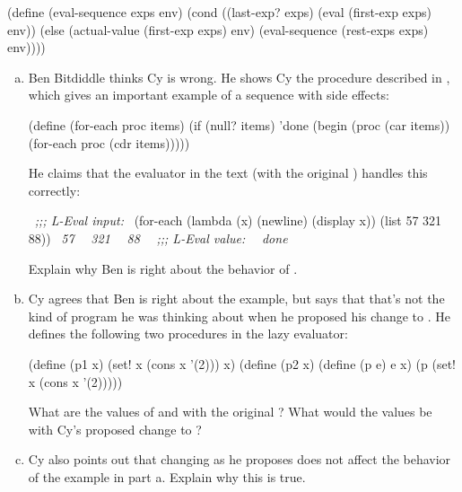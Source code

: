 \begin{exerciseGroup}
\begin{codeBlock}
(define (eval-sequence exps env)
  (cond ((last-exp? exps) (eval (first-exp exps) env))
        (else (actual-value (first-exp exps) env)
              (eval-sequence (rest-exps exps) env))))
\end{codeBlock}

\begin{enumerate}[a.]

\item
Ben Bitdiddle thinks Cy is wrong.  He shows Cy the  procedure
described in , which gives an important example of a
sequence with side effects:

\begin{codeBlock}
(define (for-each proc items)
  (if (null? items)
      'done
      (begin (proc (car items))
             (for-each proc (cdr items)))))
\end{codeBlock}

He claims that the evaluator in the text (with the original
) handles this correctly:

\begin{codeBlock}
~\textit{;;; L-Eval input:}~
(for-each (lambda (x) (newline) (display x))
          (list 57 321 88))
~\textit{57}~
~\textit{321}~
~\textit{88}~
~\textit{;;; L-Eval value:}~
~\textit{done}~
\end{codeBlock}

Explain why Ben is right about the behavior of .

\item
Cy agrees that Ben is right about the  example, but says that
that's not the kind of program he was thinking about when he proposed his
change to .  He defines the following two procedures in the
lazy evaluator:

\begin{codeBlock}
(define (p1 x)
  (set! x (cons x '(2)))
  x)
(define (p2 x)
  (define (p e)
    e
    x)
  (p (set! x (cons x '(2)))))
\end{codeBlock}

What are the values of  and  with the original
?  What would the values be with Cy's proposed change to
?

\item
Cy also points out that changing  as he proposes does not
affect the behavior of the example in part a.  Explain why this is true.


\end{enumerate}
\end{exerciseGroup}
